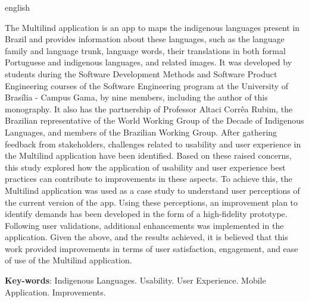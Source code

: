 \begin{resumo}[Abstract]
 \begin{otherlanguage*}{english}
   
  The Multilind application is an app to maps the indigenous languages present in Brazil and provides information about these languages, such as the language family and 
  language trunk, language words, their translations in both formal Portuguese and indigenous languages, and related images. It was developed by students during the Software Development Methods and Software Product Engineering courses of the Software Engineering program at the University of Brasília - Campus Gama, 
  by nine members, including the author of this monography. It also has the partnership of Professor Altaci Corrêa Rubim, the Brazilian representative of the World Working Group of the Decade 
  of Indigenous Languages, and members of the Brazilian Working Group. After gathering feedback from stakeholders, challenges related to usability and user experience 
  in the Multilind application have been identified. Based on these raised concerns, this study explored how the application of usability and user experience best practices can contribute to improvements in these aspects. 
  To achieve this, the Multilind application was used as a case study to understand user perceptions of the current version of the app. Using these perceptions, an improvement plan to identify demands has been developed 
  in the form of a high-fidelity prototype. Following user validations, additional enhancements was implemented in the application. Given the above, and the results achieved, it is believed that this work provided improvements 
  in terms of user satisfaction, engagement, and ease of use of the Multilind application.

   \vspace{\onelineskip}
 
   \noindent 
   \textbf{Key-words}: Indigenous Languages. Usability. User Experience. Mobile Application. Improvements.
 \end{otherlanguage*}
\end{resumo}
